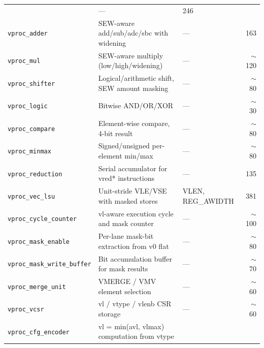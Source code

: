 \begin{table}[H]
\begin{tabular}{p{4.5cm}p{4.5cm}p{3.5cm}r}
                                   & ---                    & 246  \\
\texttt{vproc\_adder}             & SEW-aware add/sub/adc/sbc with widening
                                   & ---                    & 163  \\
\texttt{vproc\_mul}               & SEW-aware multiply (low/high/widening)
                                   & ---                    & $\sim$120 \\
\texttt{vproc\_shifter}           & Logical/arithmetic shift, SEW amount masking
                                   & ---                    & $\sim$80  \\
\texttt{vproc\_logic}             & Bitwise AND/OR/XOR
                                   & ---                    & $\sim$30  \\
\texttt{vproc\_compare}           & Element-wise compare, 4-bit result
                                   & ---                    & $\sim$80  \\
\texttt{vproc\_minmax}            & Signed/unsigned per-element min/max
                                   & ---                    & $\sim$80  \\
\texttt{vproc\_reduction}         & Serial accumulator for vred* instructions
                                   & ---                    & 135  \\
\texttt{vproc\_vec\_lsu}          & Unit-stride VLE/VSE with masked stores
                                   & VLEN, REG\_AWIDTH      & 381  \\
\texttt{vproc\_cycle\_counter}    & vl-aware execution cycle and mask counter
                                   & ---                    & $\sim$100 \\
\texttt{vproc\_mask\_enable}      & Per-lane mask-bit extraction from v0 flat
                                   & ---                    & $\sim$80  \\
\texttt{vproc\_mask\_write\_buffer} & Bit accumulation buffer for mask results
                                   & ---                    & $\sim$70  \\
\texttt{vproc\_merge\_unit}       & VMERGE / VMV element selection
                                   & ---                    & $\sim$60  \\
\texttt{vproc\_vcsr}              & vl / vtype / vlenb CSR storage
                                   & ---                    & $\sim$60  \\
\texttt{vproc\_cfg\_encoder}      & vl = min(avl, vlmax) computation from vtype

\end{tabular}
\end{table}
